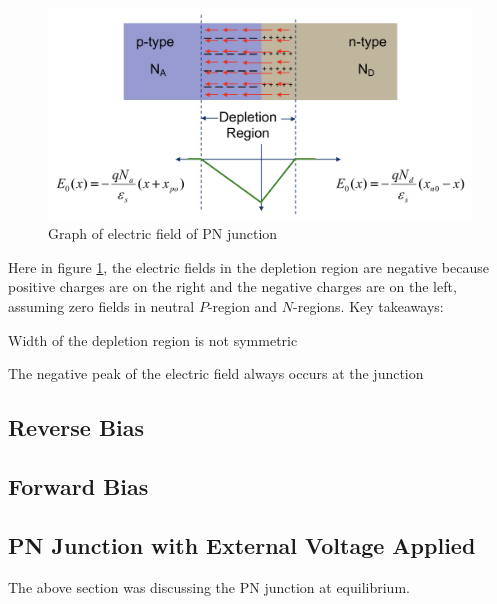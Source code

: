 \begin{figure}[H]
    \centering
    \includegraphics[scale=0.5]{figs/ch03/concentration_reader.png}
    \caption{Graph of electric field of PN junction}
    \label{fig:electric_fields_pn}
\end{figure}
Here in figure \ref{fig:electric_fields_pn}, the electric fields in the depletion region are negative because positive charges are on the right and the negative charges are on the left, assuming zero fields in neutral $P$-region and $N$-regions. Key takeaways:
\begin{pline}
    \item Width of the depletion region is not symmetric
    \item The negative peak of the electric field always occurs at the junction
\end{pline}

\subsection{Reverse Bias}

\subsection{Forward Bias}

\subsection{PN Junction with External Voltage Applied}
The above section was discussing the PN junction at equilibrium.


